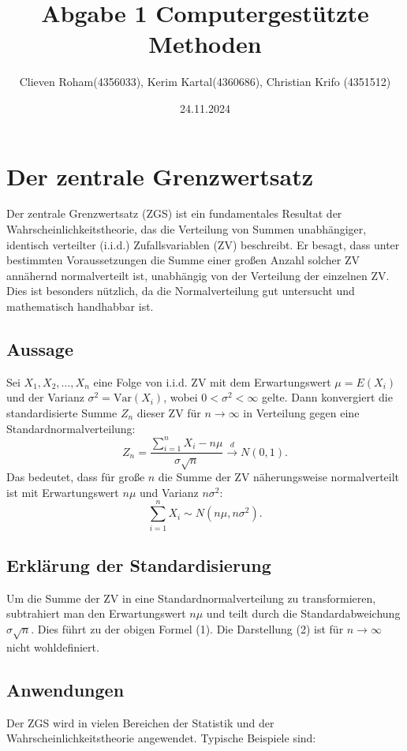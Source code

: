 \documentclass[a4paper,12pt]{article}
\title{Abgabe 1 Computergestützte Methoden}
\author{Clieven Roham(4356033), Kerim Kartal(4360686), Christian Krifo (4351512)}
\date{24.11.2024}
\begin{document}
\maketitle
\tableofcontents
\section{Der zentrale Grenzwertsatz}

Der zentrale Grenzwertsatz (ZGS) ist ein fundamentales Resultat der Wahrscheinlichkeitstheorie, das
die Verteilung von Summen unabhängiger, identisch verteilter (i.i.d.) Zufallsvariablen (ZV) beschreibt.
Er besagt, dass unter bestimmten Voraussetzungen die Summe einer großen Anzahl solcher ZV
annähernd normalverteilt ist, unabhängig von der Verteilung der einzelnen ZV. Dies ist besonders
nützlich, da die Normalverteilung gut untersucht und mathematisch handhabbar ist.

\subsection{Aussage}
Sei $X_1, X_2, \ldots, X_n$ eine Folge von i.i.d. ZV mit dem Erwartungswert $\mu = E(X_i)$ und der
Varianz $\sigma^2 = \text{Var}(X_i)$, wobei $0 < \sigma^2 < \infty$ gelte. Dann konvergiert die
standardisierte Summe $Z_n$ dieser ZV für $n \to \infty$ in Verteilung gegen eine
Standardnormalverteilung:
\[
Z_n = \frac{\sum_{i=1}^n X_i - n\mu}{\sigma\sqrt{n}} \xrightarrow{d} N(0,1).
\]
Das bedeutet, dass für große $n$ die Summe der ZV näherungsweise normalverteilt ist mit
Erwartungswert $n\mu$ und Varianz $n\sigma^2$:
\[
\sum_{i=1}^n X_i \sim N(n\mu, n\sigma^2).
\]
\subsection{Erklärung der Standardisierung}

Um die Summe der ZV in eine Standardnormalverteilung zu transformieren, subtrahiert man den
Erwartungswert $n\mu$ und teilt durch die Standardabweichung $\sigma\sqrt{n}$. Dies führt zu der
obigen Formel (1). Die Darstellung (2) ist für $n \to \infty$ nicht wohldefiniert.
\subsection{Anwendungen}
Der ZGS wird in vielen Bereichen der Statistik und der Wahrscheinlichkeitstheorie angewendet.
Typische Beispiele sind:
\end{document}
